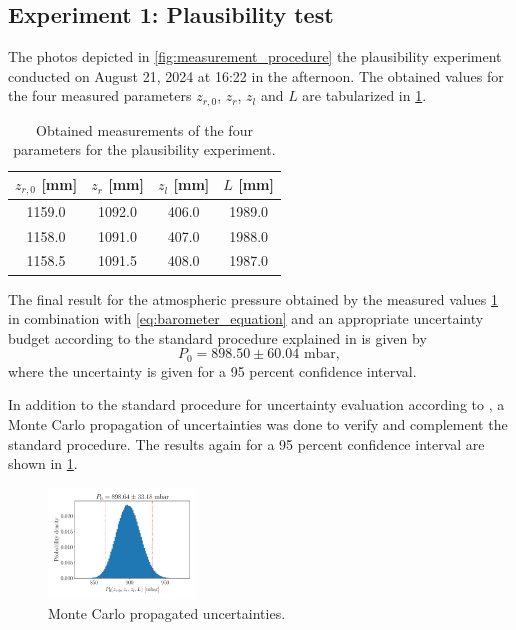 \documentclass[a4paper,10pt, twocolumn]{article}
\begin{document}
\subsection{Experiment 1: Plausibility test}
The photos depicted in \cref{fig:measurement_procedure} the plausibility experiment conducted on August 21, 2024 at 16:22 in the afternoon. The obtained values for the four measured parameters $z_{r,0}$, $z_r$, $z_l$ and $L$ are tabularized in \cref{tab:meas_values}.
\begin{table}[h]
	\small
	\centering
	\begin{tabular}{|c|c|c|c|}
		\hline
		\textbf{$z_{r,0}$ [mm]} & \textbf{$z_r$ [mm]} & \textbf{$z_l$ [mm]} & \textbf{$L$ [mm]} \\
	\hline\hline
	1159.0 & 1092.0 & 406.0	& 1989.0 \\
	\hline
	1158.0 & 1091.0 & 407.0	& 1988.0 \\
	\hline
	1158.5 & 1091.5 & 408.0 & 1987.0 \\
	\hline
	\end{tabular}
	\label{tab:meas_values}
	\caption{Obtained measurements of the four parameters for the plausibility experiment.}
\end{table}

The final result for the atmospheric pressure obtained by the measured values \cref{tab:meas_values} in combination with \cref{eq:barometer_equation} and an appropriate uncertainty budget according to the standard procedure explained in \cite{GUM2023} is given by \begin{equation}
	P_0 = 898.50 \pm 60.04 \text{ mbar},
\end{equation} where the uncertainty is given for a 95 percent confidence interval. 

In addition to the standard procedure for uncertainty evaluation according to \cite{GUM2023}, a Monte Carlo propagation of uncertainties was done to verify and complement the standard procedure. The results again for a 95 percent confidence interval are shown in \cref{fig:result_mc}.
\begin{figure}[h]
	\centering
	\includegraphics[width=0.35\textwidth]{figures/result_mc.pdf}
	\caption{Monte Carlo propagated uncertainties.}
	\label{fig:result_mc}
\end{figure}
\end{document}
